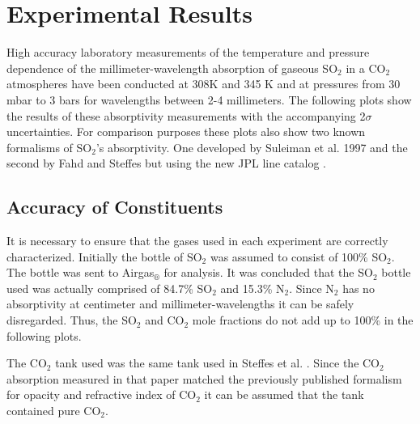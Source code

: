 \clearpage
\section{Experimental Results}
High accuracy laboratory measurements of the temperature and pressure dependence of the millimeter-wavelength absorption of gaseous SO$_2$ in a CO$_2$ atmospheres have been conducted at 308K and 345 K and at pressures from 30 mbar to 3 bars for wavelengths between 2-4 millimeters. The following plots show the results of these absorptivity measurements with the accompanying 2$\sigma$ uncertainties. For comparison purposes these plots also show two known formalisms of SO$_2$'s absorptivity. One developed by Suleiman et al. 1997 \cite{Suleiman-thesis} and the second by Fahd and Steffes \cite{Fahd-thesis} but using the new JPL line catalog \cite{Pickett-1998}. 

\subsection{Accuracy of Constituents}

It is necessary to ensure that the gases used in each experiment are correctly characterized. Initially the bottle of SO$_2$ was assumed to consist of 100\% SO$_2$. The bottle was sent to Airgas$_\circledR$ for analysis. It was concluded that the SO$_2$ bottle used was actually comprised of 84.7\% SO$_2$ and 15.3\% N$_2$. Since N$_2$ has no absorptivity at centimeter and millimeter-wavelengths it can be safely disregarded. Thus, the SO$_2$  and CO$_2$ mole fractions do not add up to 100\% in the following plots. 




The CO$_2$ tank used was the same tank used in Steffes et al. \cite{Steffes-2014}. Since the CO$_2$ absorption measured in that paper matched the previously published formalism for opacity and refractive index of CO$_2$ \cite{Ho-1966} it can be assumed that the tank contained pure CO$_2$.

